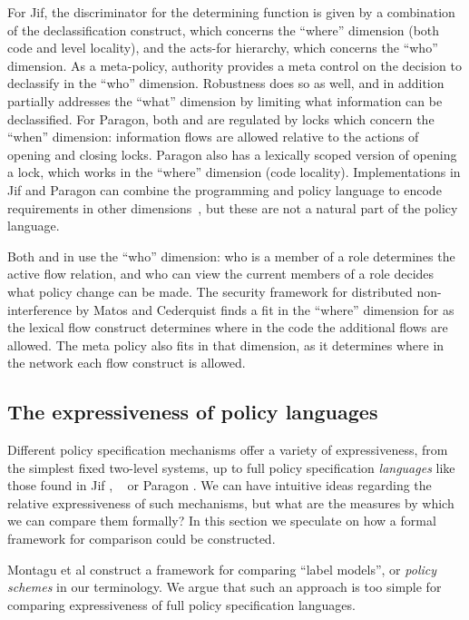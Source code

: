 For Jif, the discriminator for the determining function \dynamicpol{} is given by a combination
of the declassification construct, which concerns the ``where'' dimension (both code and level locality), and
the acts-for hierarchy, which concerns the ``who'' dimension.
As a meta-policy, authority provides a meta control on the decision to
declassify in the ``who'' dimension.
Robustness does so as well, and in addition partially addresses the ``what'' dimension by limiting what information can be declassified.
For Paragon, both \dynamicpol{} and \metapol{} are regulated by locks which concern the ``when'' 
dimension: information flows are allowed relative to the actions of opening and closing locks.
Paragon also has a lexically scoped version of opening a lock, which works in the ``where'' dimension
(code locality).
Implementations in Jif and Paragon can combine the programming and policy language to encode
requirements in other dimensions~\cite{Askarov:Sabelfeld:ESORICS2005,Paragon,paragontut},
but these are not a natural part of the policy language.

Both \dynamicpol{} and \metapol{} in \Rx{} use the ``who'' dimension: who is a member of a role
determines the active flow relation, and who can view the current members of a role decides what
policy change can be made.
The security framework for distributed non-interference by Matos and Cederquist finds a fit in
the ``where'' dimension for \dynamicpol{} as the lexical flow construct determines where in the code the additional
flows are allowed. The meta policy also fits in that dimension, as it determines where in the network each flow construct is allowed.

\subsection{The expressiveness of policy languages}
\label{sec:pollang:expressivity}

Different policy specification mechanisms offer a variety of expressiveness, from the
simplest fixed two-level systems, up to full policy specification \emph{languages}
like those found in Jif \cite{jif}, \Rx{}~\cite{Swamy+:Managing} or Paragon \cite{Paragon}.
We can have intuitive ideas regarding the relative expressiveness of such mechanisms,
but what are the measures by which we can compare them formally? In this section we speculate
on how a formal framework for comparison could be constructed.



Montagu et al \cite{Montagu13} construct a framework for comparing ``label models'',
or \emph{policy schemes} in our terminology. We argue that such an approach is too simple
for comparing expressiveness of full policy specification languages.

